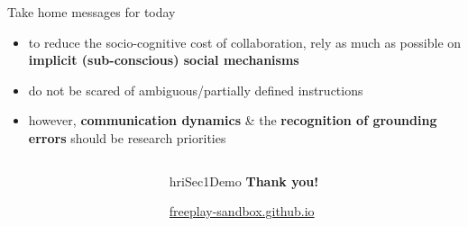 \documentclass[compress]{beamer}
\begin{document}
\begin{frame}{Take home messages for today}

    \begin{itemize}
        \item<+-> to reduce the socio-cognitive cost of collaboration, rely as much
            as possible on {\bf implicit (sub-conscious) social mechanisms}
        \item<+-> do not be scared of ambiguous/partially defined instructions
        \item<+-> however, {\bf communication dynamics} \& the {\bf recognition of grounding
            errors} should be research priorities
    \end{itemize}

\end{frame}

{
\begin{frame}[plain]

    \begin{columns}
        \begin{column}{0.5\linewidth}
        \end{column}
        \begin{column}{0.5\linewidth}

    \vspace{7cm}
\begin{beamercolorbox}[wd=\linewidth,ht=6ex,dp=0.7ex]{hriSec1Demo}
    \textbf{Thank you!}

    \vspace{2em}
    \href{https://freeplay-sandbox.github.io}{freeplay-sandbox.github.io}
\end{beamercolorbox}
        \end{column}
    \end{columns}
\end{frame}
}


\end{document}
